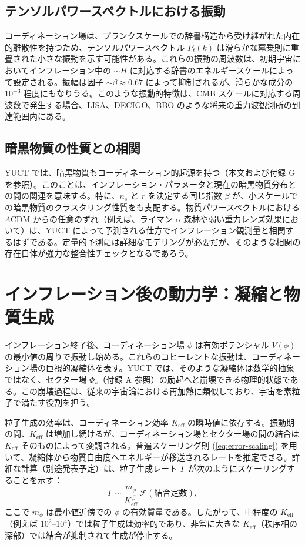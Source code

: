 \documentclass[11pt,a4paper]{article}
\newcommand{\Keff}{K_{\mathrm{eff}}}
\begin{document}
	\subsection{テンソルパワースペクトルにおける振動}
	
	コーディネーション場は、プランクスケールでの辞書構造から受け継がれた内在的離散性を持つため、テンソルパワースペクトル \(P_t(k)\) は滑らかな冪乗則に重畳された小さな振動を示す可能性がある。これらの振動の周波数は、初期宇宙においてインフレーション中の \(\sim H\) に対応する辞書のエネルギースケールによって設定される。振幅は因子 \(\sim \beta \approx 0.67\) によって抑制されるが、滑らかな成分の \(10^{-3}\) 程度にもなりうる。このような振動的特徴は、CMB スケールに対応する周波数で発生する場合、LISA、DECIGO、BBO のような将来の重力波観測所の到達範囲内にある。
	
	\subsection{暗黒物質の性質との相関}
	
	YUCT では、暗黒物質もコーディネーション的起源を持つ（本文および付録 G を参照）。このことは、インフレーション・パラメータと現在の暗黒物質分布との間の関連を意味する。特に、\(n_s\) と \(r\) を決定する同じ指数 \(\beta\) が、小スケールでの暗黒物質のクラスタリング性質をも支配する。物質パワースペクトルにおける \(\Lambda\)CDM からの任意のずれ（例えば、ライマン-\(\alpha\) 森林や弱い重力レンズ効果において）は、YUCT によって予測される仕方でインフレーション観測量と相関するはずである。定量的予測には詳細なモデリングが必要だが、そのような相関の存在自体が強力な整合性チェックとなるであろう。
	
	\section{インフレーション後の動力学：凝縮と物質生成}
	\label{sec:postinflation}
	
	インフレーション終了後、コーディネーション場 \(\phi\) は有効ポテンシャル \(V(\phi)\) の最小値の周りで振動し始める。これらのコヒーレントな振動は、コーディネーション場の巨視的凝縮体を表す。YUCT では、そのような凝縮体は数学的抽象ではなく、セクター場 \(\Phi_s\)（付録 A 参照）の励起へと崩壊できる物理的状態である。この崩壊過程は、従来の宇宙論における再加熱に類似しており、宇宙を素粒子で満たす役割を担う。
	
	粒子生成の効率は、コーディネーション効率 \(\Keff\) の瞬時値に依存する。振動期の間、\(\Keff\) は増加し続けるが、コーディネーション場とセクター場の間の結合は \(\Keff\) そのものによって変調される。普遍スケーリング則 (\ref{eq:error-scaling}) を用いて、凝縮体から物質自由度へエネルギーが移送されるレートを推定できる。詳細な計算（別途発表予定）は、粒子生成レート \(\Gamma\) が次のようにスケーリングすることを示す：
	\begin{equation}
		\Gamma \sim \frac{m_\phi}{\Keff^{\,\beta}} \, \mathcal{F}(\text{結合定数}),
		\label{eq:gamma}
	\end{equation}
	ここで \(m_\phi\) は最小値近傍での \(\phi\) の有効質量である。したがって、中程度の \(\Keff\)（例えば \(10^2\)–\(10^4\)）では粒子生成は効率的であり、非常に大きな \(\Keff\)（秩序相の深部）では結合が抑制されて生成が停止する。
	
\end{document}
